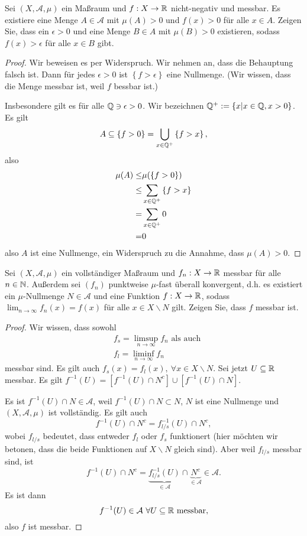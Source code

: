 
\begin{Problem}
	Sei $(X,\mathcal{A},\mu)$ ein Maßraum und $f:X\to \mathbb{R}$ nicht-negativ und messbar. Es existiere eine Menge $A\in \mathcal{A}$ mit $\mu(A)>0$ und $f(x)>0$ f\"{u}r alle $x\in A$. Zeigen Sie, dass ein $\epsilon>0$ und eine Menge $B\in A$ mit $\mu(B)>0$ existieren, sodass $f(x)>\epsilon$ f\"{u}r alle $x\in B$ gibt.
\end{Problem}

\begin{proof}
	Wir beweisen es per Widerspruch. Wir nehmen an, dass die Behauptung falsch ist. Dann f\"{u}r jedes $\epsilon>0$ ist $\left\{ f>\epsilon \right\} $ eine Nullmenge. (Wir wissen, dass die Menge messbar ist, weil $f$ bessbar ist.)

	Insbesondere gilt es f\"{u}r alle $\mathbb{Q}\ni \epsilon >0$. Wir bezeichnen $\mathbb{Q}^+:=\left\{ x|x\in \mathbb{Q}, x>0 \right\} $. Es gilt
	\[
	A\subseteq \left\{ f>0 \right\} =\bigcup_{x\in \mathbb{Q}^+} \left\{ f>x \right\} 
,\] 
also
\begin{align*}
	\mu(A)\le& \mu(\left\{ f>0 \right\} )\\
	\le& \sum_{x\in \mathbb{Q}^+} \left\{ f>x \right\} \\
	=& \sum_{x\in \mathbb{Q}^+} 0\\
	=& 0
\end{align*}
also $A$ ist eine Nullmenge, ein Widerspruch zu die Annahme, dass $\mu(A)>0$.
\end{proof}
\begin{Problem}
	Sei $(X,\mathcal{A},\mu)$ ein vollst\"{a}ndiger Maßraum und $f_n:X\to \mathbb{R}$ messbar f\"{u}r alle $n\in \mathbb{N}$. Außerdem sei $(f_n)$ punktweise $\mu$-fast überall konvergent, d.h. es existiert ein $\mu$-Nullmenge $N\in \mathcal{A}$ und eine Funktion $f:X\to \mathbb{R}$, sodass $\lim_{n \to \infty} f_n(x)=f(x)$ f\"{u}r alle $x\in X\backslash N$ gilt. Zeigen Sie, dass $f$ messbar ist.
\end{Problem}
\begin{proof}
	Wir wissen, dass sowohl
	\begin{align*}
		& f_s=\limsup_{n\to\infty} f_n\text{ als auch}\\
		& f_l=\liminf_{n\to\infty} f_n
	\end{align*}
	messbar sind. Es gilt auch $f_s(x)=f_l(x),~\forall x\in X\backslash N$. Sei jetzt $U\subseteq \mathbb{R}$ messbar. Es gilt $f^{-1}(U)=\left[f^{-1}(U)\cap N^c\right]\cup \left[f^{-1}(U)\cap N\right]$. 

	Es ist $f^{-1}(U)\cap N\in \mathcal{A}$, weil $f^{-1}(U)\cap N\subset N$, $N$ ist eine Nullmenge und $(X,\mathcal{A},\mu)$ ist vollständig. Es gilt auch
	\[
		f^{-1}(U)\cap N^c=f_{l / s}^{-1}(U)\cap N^c
	,\] 
	wobei $f_{l / s}$ bedeutet, dass entweder $f_l$ oder $f_s$ funktionert (hier möchten wir betonen, dass die beide Funktionen auf $X \backslash N$ gleich sind). Aber weil $f_{l / s}$ messbar sind, ist
	\[
		f^{-1}(U)\cap N^c=\underbrace{f_{l / s}^{-1}(U)}_{\in \mathcal{A}}\cap \underbrace{N^c}_{\in \mathcal{A}}\in \mathcal{A}
	.\] 
	Es ist dann
	\[
		f^{-1}(U)\in \mathcal{A}~\forall U\subseteq \mathbb{R}\text{ messbar}
	,\] 
	also $f$ ist messbar.
\end{proof}
